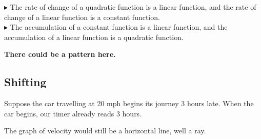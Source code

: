 \documentclass{ximera}
\begin{document}
\textbf{\textcolor{blue!55!black}{$\blacktriangleright$}} The rate of change of a quadratic function is a linear function, and the rate of change of a linear function is a constant function. \\





\textbf{\textcolor{blue!55!black}{$\blacktriangleright$}} The accumulation of a constant function is a linear function, and the accumulation of a linear function is a quadratic function. \\





\begin{center}
\textbf{\textcolor{purple!85!blue}{There could be a pattern here.}}
\end{center}












\subsection*{Shifting}


Suppose the car travelling at 20 mph begins its journey 3 hours late.  When the car begins, our timer already reads 3 hours.



The graph of velocity would still be a horizontal line, well a ray.



\begin{image}
\end{image}
\end{document}
